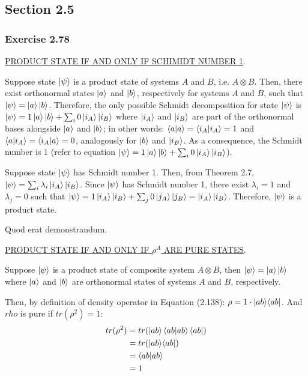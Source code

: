 \subsection{Section 2.5}
\subsubsection{Exercise 2.78}
\MakeUppercase{\underline{Product State if and only if Schimidt number 1}}.

Suppose state $\ket{\psi}$ is a product state of systems
$A$ and $B$, i.e. $A \otimes B$.
Then, there exist orthonormal states $\ket{a}$ and $\ket{b}$,
respectively for systems $A$ and $B$, such that
$\ket{\psi} = \ket{a} \ket{b}$.
Therefore, the only possible Schmidt decomposition for state $\ket{\psi}$ is
$\ket{\psi} = 1 \ket{a} \ket{b} + \sum_i 0 \ket{i_A} \ket{i_B}$ where
$\ket{i_A}$ and $\ket{i_B}$ are part of the orthonormal bases alongside
$\ket{a}$ and $\ket{b}$; in other words:
$\mathop{\mathinner{ \langle{a}|{a}\rangle}} = \mathop{\mathinner{ \langle{i_A}|{i_A}\rangle}} = 1$ and
$\mathop{\mathinner{ \langle{a}|{i_A}\rangle}} = \mathop{\mathinner{ \langle{i_A}|{a}\rangle}} = 0$,
analogously for $\ket{b}$ and $\ket{i_B}$.
As a consequence, the Schmidt number is 1
(refer to equation
$\ket{\psi} = 1 \ket{a} \ket{b} + \sum_i 0 \ket{i_A} \ket{i_B}$).

Suppose state $\ket{\psi}$ has Schmidt number 1.
Then, from Theorem 2.7,
$\ket{\psi} = \sum_i \lambda_i \ket{i_A} \ket{i_B}$.
Since $\ket{\psi}$ has Schmidt number 1,
there exist $\lambda_i = 1$ and $\lambda_j = 0$ such that
$\ket{\psi} = 1 \ket{i_A} \ket{i_B} + \sum_j 0 \ket{j_A} \ket{j_B}
= \ket{i_A} \ket{i_B}$.
Therefore, $\ket{\psi}$ is a product state.

Quod erat demonstrandum.

\MakeUppercase{\underline{Product State if and only if $\rho^A$ are pure states}}.

Suppose $\ket{\psi}$ is a product state of composite system
$A \otimes B$, then $\ket{\psi} = \ket{a}\ket{b}$ where
$\ket{a}$ and $\ket{b}$ are orthonormal states of systems
$A$ and $B$, respectively.

Then, by definition of density operator in Equation (2.138):
$\rho = 1 \cdot \mathop{\mathinner{ |{ab}\rangle \langle{ab}|}}$.
And $rho$ is pure if $tr(\rho^2) = 1$:
\begin{align}
    tr(\rho^2) &= tr(\ket{ab}\mathop{\mathinner{ \langle{ab}|{ab}\rangle}}\bra{ab}) \\
    &= tr(\mathop{\mathinner{ |{ab}\rangle \langle{ab}|}}) \\
    &= \mathop{\mathinner{ \langle{ab}|{ab}\rangle}} \\
    &= 1
\end{align}

